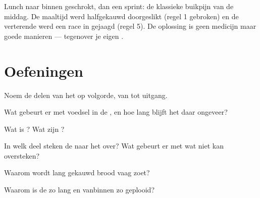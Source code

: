 \begin{example}[De buikpijndetective]\label{ex:g4:journey-of-food:ache}
Lunch naar binnen geschrokt, dan een sprint: de klassieke buikpijn van
de middag. De maaltijd werd halfgekauwd doorgeslikt (regel 1 gebroken)
en de verterende  werd een race in gejaagd (regel 5). De oplossing
is geen medicijn maar goede manieren --- tegenover je eigen
.
\end{example}

\section{Oefeningen}

\begin{exercise}[$\star$]\label{exo:g4:journey-of-food:1}
Noem de delen van het  op volgorde, van  tot uitgang.
\end{exercise}

\begin{exercise}[$\star$]\label{exo:g4:journey-of-food:2}
Wat gebeurt er met voedsel in de , en hoe lang blijft het daar
ongeveer?
\end{exercise}

\begin{exercise}[$\star$]\label{exo:g4:journey-of-food:3}
Wat is ? Wat zijn ?
\end{exercise}

\begin{exercise}[$\star$]\label{exo:g4:journey-of-food:4}
In welk deel steken de  naar het  over? Wat gebeurt
er met wat niet kan oversteken?
\end{exercise}

\begin{exercise}[$\star$]\label{exo:g4:journey-of-food:5}
Waarom wordt lang gekauwd brood vaag zoet?
\end{exercise}

\begin{exercise}[$\star$]\label{exo:g4:journey-of-food:6}
Waarom is de  zo lang en vanbinnen zo geplooid?
\end{exercise}

